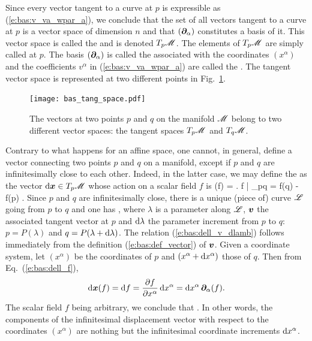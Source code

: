 \ee
Since every vector tangent to a curve at $p$ is expressible as (\ref{e:bas:v_va_wpar_a}), we conclude that
the set of all vectors tangent to a curve at $p$ is a vector space of dimension $n$ and that $(\bm{\partial}_\alpha)$ constitutes a basis of it. This vector space is
called the
 and is denoted $T_p\mathscr{M}$.
The elements of $T_p\mathscr{M}$ are simply called  at $p$.
The basis $(\bm{\partial}_\alpha)$ is called the  associated with
the coordinates $(x^\alpha)$ and the coefficients $v^\alpha$ in (\ref{e:bas:v_va_wpar_a}) are called the .
The tangent vector space is represented at two different points in Fig.~\ref{f:bas:tang_space}.

\begin{figure}
\centerline{\texttt{[image: bas\_tang\_space.pdf]}}
\caption[]{\label{f:bas:tang_space} \footnotesize
The vectors at two points $p$ and $q$ on the
manifold $\mathscr{M}$ belong to two different vector spaces:
the tangent spaces $T_p\mathscr{M}$ and $T_q\mathscr{M}$.}
\end{figure}

Contrary to what happens for an affine space, one cannot, in general, define a vector connecting two points $p$ and $q$ on a manifold, except if $p$ and $q$ are infinitesimally close to each other. Indeed, in the latter case, we may define
the  as the vector $\mathrm{d}\bm{x}\in{{T_p\mathscr{M}}}$ whose action on a scalar field $f$ is
\be \label{e:bas:dell_f}
  \D{}(f) = \left. \D f \right| _{p\rightarrow q} = f(q) - f(p) .
\ee
Since $p$ and $q$ are infinitesimally close, there is a unique (piece of) curve
$\mathscr{L}$ going
from $p$ to $q$ and one has
\be \label{e:bas:dell_v_dlamb}
  ,
\ee
where $\lambda$ is a parameter along $\mathscr{L}$, $\bm{v}$ the associated tangent
vector at $p$ and $\mathrm{d}\lambda$ the parameter
increment from $p$ to $q$: $p=P(\lambda)$ and $q=P(\lambda+\mathrm{d}\lambda)$.
The relation (\ref{e:bas:dell_v_dlamb}) follows immediately from the definition
(\ref{e:bas:def_vector}) of $\bm{v}$.
Given a coordinate system, let $(x^\alpha)$ be the coordinates
of $p$ and $(x^\alpha+\mathrm{d} x^\alpha)$ those of $q$. Then from Eq.~(\ref{e:bas:dell_f}),
\[
  \mathrm{d}\bm{x}(f) =   \mathrm{d} f  = \frac{\partial f}{\partial x^\alpha} \, \mathrm{d} x^\alpha
  = \mathrm{d} x^\alpha \, \bm{\partial}_\alpha(f) .
\]
The scalar field $f$ being arbitrary, we conclude that
\be \label{e:bas:dell_dxa_wpar}
   .
\ee
In other words, the components of the infinitesimal displacement vector with respect
to the coordinates $(x^\alpha)$ are nothing but the infinitesimal coordinate
increments $\mathrm{d} x^\alpha$.

